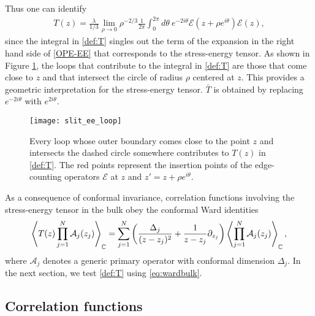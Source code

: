 \documentclass[a4paper,11pt]{article}
\begin{document}
Thus one can identify
\begin{align} \label{def:T}
    T(z) = \frac{\lambda}{1/3} \lim_{\rho \to 0} \rho^{-2/3}
    \frac{1}{2\pi} \int_0^{2\pi} d \theta ~ e^{-2 i \theta}
    \mathcal{E}(z+\rho e^{i \theta}) \mathcal{E}(z),
\end{align}
since the integral in \eqref{def:T} singles out the term of the expansion in the right hand side of \eqref{OPE-EE} that corresponds to the stress-energy tensor. 
As shown in Figure \ref{fig:slit}, the loops that contribute to the integral in \eqref{def:T} are those that come close to $z$ and that intersect the circle of radius $\rho$ centered at $z$. This provides a geometric interpretation for the stress-energy tensor.
$\bar{T}$ is obtained by replacing $e^{-2i \theta}$ with $e^{2i \theta}$.


\begin{figure}[t]
    \centering
    \texttt{[image: slit\_ee\_loop]}
    \caption{Every loop whose outer boundary comes close to the point $z$ and intersects the dashed circle somewhere contributes to $T(z)$ in \eqref{def:T}.
    The red points represent the insertion points of the edge-counting operators $\mathcal{E}$ at $z$ and $z' = z + \rho e^{i \theta}$.}
    \label{fig:slit}
\end{figure}


As a consequence of conformal invariance, correlation functions involving the stress-energy tensor in the bulk obey the conformal Ward identities
\begin{align} \label{eq:wardbulk}
    \Braket{ T(z) \prod_{j=1}^N \mathcal{A}_j(z_j) }_\mathbb{C} = \sum_{j=1}^N \left(
    \frac{\Delta_j}{(z-z_j)^2} + \frac{1}{z-z_j}\partial_{z_j}
    \right) \Braket{\prod_{j=1}^N \mathcal{A}_j(z_j)}_\mathbb{C},
\end{align}
where $\mathcal{A}_j$ denotes a generic primary operator with conformal dimension $\Delta_j$. In the next section, we test \eqref{def:T} using \eqref{eq:wardbulk}.



\subsection{Correlation functions}
\end{document}
